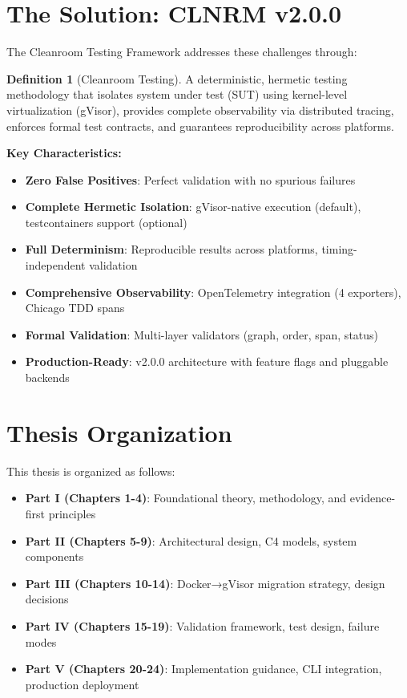 \documentclass[12pt,twoside,openright]{book}
\theoremstyle{plain}
\theoremstyle{definition}
\newtheorem{definition}[theorem]{Definition}
\theoremstyle{remark}
\begin{document}
\section{The Solution: CLNRM v2.0.0}

The Cleanroom Testing Framework addresses these challenges through:

\begin{definition}[Cleanroom Testing]
A deterministic, hermetic testing methodology that isolates system under test (SUT) using kernel-level virtualization (gVisor), provides complete observability via distributed tracing, enforces formal test contracts, and guarantees reproducibility across platforms.
\end{definition}

\textbf{Key Characteristics:}

\begin{itemize}
  \item \textbf{Zero False Positives}: Perfect validation with no spurious failures
  \item \textbf{Complete Hermetic Isolation}: gVisor-native execution (default), testcontainers support (optional)
  \item \textbf{Full Determinism}: Reproducible results across platforms, timing-independent validation
  \item \textbf{Comprehensive Observability}: OpenTelemetry integration (4 exporters), Chicago TDD spans
  \item \textbf{Formal Validation}: Multi-layer validators (graph, order, span, status)
  \item \textbf{Production-Ready}: v2.0.0 architecture with feature flags and pluggable backends
\end{itemize}

\section{Thesis Organization}

This thesis is organized as follows:

\begin{itemize}
  \item \textbf{Part I (Chapters 1-4)}: Foundational theory, methodology, and evidence-first principles
  \item \textbf{Part II (Chapters 5-9)}: Architectural design, C4 models, system components
  \item \textbf{Part III (Chapters 10-14)}: Docker→gVisor migration strategy, design decisions
  \item \textbf{Part IV (Chapters 15-19)}: Validation framework, test design, failure modes
  \item \textbf{Part V (Chapters 20-24)}: Implementation guidance, CLI integration, production deployment
\end{itemize}
\end{document}
